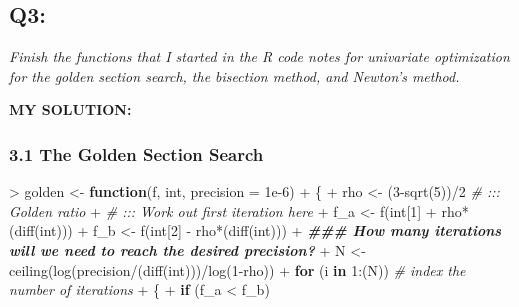 \documentclass[
]{article}
\newenvironment{Shaded}{\begin{snugshade}}{\end{snugshade}}
\newcommand{\AttributeTok}[1]{\textcolor[rgb]{0.77,0.63,0.00}{#1}}
\newcommand{\CommentTok}[1]{\textcolor[rgb]{0.56,0.35,0.01}{\textit{#1}}}
\newcommand{\ControlFlowTok}[1]{\textcolor[rgb]{0.13,0.29,0.53}{\textbf{#1}}}
\newcommand{\DecValTok}[1]{\textcolor[rgb]{0.00,0.00,0.81}{#1}}
\newcommand{\DocumentationTok}[1]{\textcolor[rgb]{0.56,0.35,0.01}{\textbf{\textit{#1}}}}
\newcommand{\FloatTok}[1]{\textcolor[rgb]{0.00,0.00,0.81}{#1}}
\newcommand{\FunctionTok}[1]{\textcolor[rgb]{0.00,0.00,0.00}{#1}}
\newcommand{\NormalTok}[1]{#1}
\newcommand{\OtherTok}[1]{\textcolor[rgb]{0.56,0.35,0.01}{#1}}
\newcommand{\SpecialCharTok}[1]{\textcolor[rgb]{0.00,0.00,0.00}{#1}}
\begin{document}
\hypertarget{q3}{%
\subsection{Q3:}\label{q3}}

\emph{Finish the functions that I started in the R code notes for
univariate optimization for the golden section search, the bisection
method, and Newton's method.}

\textbf{MY SOLUTION:}

\hypertarget{the-golden-section-search}{%
\subsubsection{3.1 The Golden Section
Search}\label{the-golden-section-search}}

\begin{Shaded}
\begin{Highlighting}[]
\SpecialCharTok{\textgreater{}}\NormalTok{ golden }\OtherTok{\textless{}{-}} \ControlFlowTok{function}\NormalTok{(f, int, }\AttributeTok{precision =} \FloatTok{1e{-}6}\NormalTok{)}
\SpecialCharTok{+}\NormalTok{ \{}
\SpecialCharTok{+}\NormalTok{   rho }\OtherTok{\textless{}{-}}\NormalTok{ (}\DecValTok{3}\SpecialCharTok{{-}}\FunctionTok{sqrt}\NormalTok{(}\DecValTok{5}\NormalTok{))}\SpecialCharTok{/}\DecValTok{2} \CommentTok{\# ::: Golden ratio}
\SpecialCharTok{+}   \CommentTok{\# ::: Work out first iteration here}
\SpecialCharTok{+}\NormalTok{   f\_a }\OtherTok{\textless{}{-}} \FunctionTok{f}\NormalTok{(int[}\DecValTok{1}\NormalTok{] }\SpecialCharTok{+}\NormalTok{ rho}\SpecialCharTok{*}\NormalTok{(}\FunctionTok{diff}\NormalTok{(int)))}
\SpecialCharTok{+}\NormalTok{   f\_b }\OtherTok{\textless{}{-}} \FunctionTok{f}\NormalTok{(int[}\DecValTok{2}\NormalTok{] }\SpecialCharTok{{-}}\NormalTok{ rho}\SpecialCharTok{*}\NormalTok{(}\FunctionTok{diff}\NormalTok{(int)))}
\SpecialCharTok{+}   \DocumentationTok{\#\#\# How many iterations will we need to reach the desired precision?}
\SpecialCharTok{+}\NormalTok{   N }\OtherTok{\textless{}{-}} \FunctionTok{ceiling}\NormalTok{(}\FunctionTok{log}\NormalTok{(precision}\SpecialCharTok{/}\NormalTok{(}\FunctionTok{diff}\NormalTok{(int)))}\SpecialCharTok{/}\FunctionTok{log}\NormalTok{(}\DecValTok{1}\SpecialCharTok{{-}}\NormalTok{rho))}
\SpecialCharTok{+}   \ControlFlowTok{for}\NormalTok{ (i }\ControlFlowTok{in} \DecValTok{1}\SpecialCharTok{:}\NormalTok{(N))                    }\CommentTok{\# index the number of iterations}
\SpecialCharTok{+}\NormalTok{   \{}
\SpecialCharTok{+}     \ControlFlowTok{if}\NormalTok{ (f\_a }\SpecialCharTok{\textless{}}\NormalTok{ f\_b)  }

\end{Highlighting}
\end{Shaded}
\end{document}
